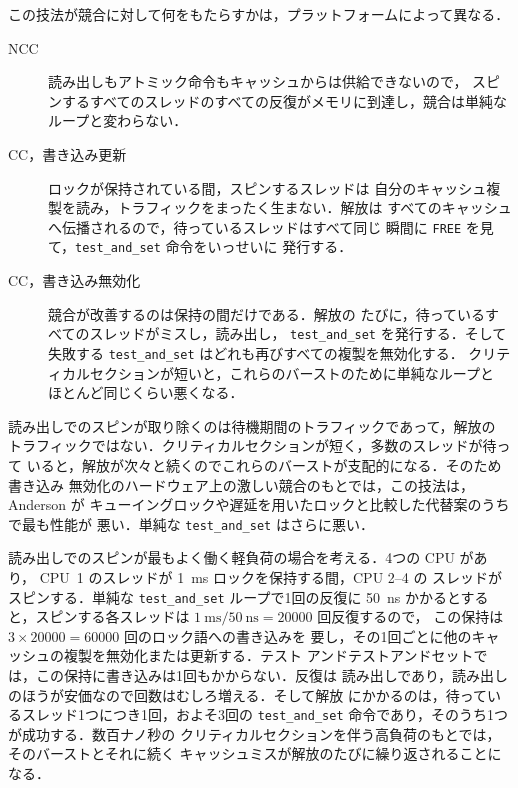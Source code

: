 \documentclass[../main.tex]{subfiles}
\begin{document}
この技法が競合に対して何をもたらすかは，プラットフォームによって異なる．
\begin{description}
  \item[NCC] 読み出しもアトミック命令もキャッシュからは供給できないので，
    スピンするすべてのスレッドのすべての反復がメモリに到達し，競合は単純な
    ループと変わらない．
  \item[CC，書き込み更新] ロックが保持されている間，スピンするスレッドは
    自分のキャッシュ複製を読み，トラフィックをまったく生まない．解放は
    すべてのキャッシュへ伝播されるので，待っているスレッドはすべて同じ
    瞬間に \texttt{FREE} を見て，\texttt{test\_and\_set} 命令をいっせいに
    発行する．
  \item[CC，書き込み無効化] 競合が改善するのは保持の間だけである．解放の
    たびに，待っているすべてのスレッドがミスし，読み出し，
    \texttt{test\_and\_set} を発行する．そして失敗する
    \texttt{test\_and\_set} はどれも再びすべての複製を無効化する．
    クリティカルセクションが短いと，これらのバーストのために単純なループと
    ほとんど同じくらい悪くなる．
\end{description}
読み出しでのスピンが取り除くのは待機期間のトラフィックであって，解放の
トラフィックではない．クリティカルセクションが短く，多数のスレッドが待って
いると，解放が次々と続くのでこれらのバーストが支配的になる．そのため書き込み
無効化のハードウェア上の激しい競合のもとでは，この技法は，Anderson が
キューイングロックや遅延を用いたロックと比較した代替案のうちで最も性能が
悪い．単純な \texttt{test\_and\_set} はさらに悪い．

\begin{example}
  読み出しでのスピンが最もよく働く軽負荷の場合を考える．4つの CPU があり，
  CPU~1 のスレッドが \SI{1}{\milli\second} ロックを保持する間，CPU 2--4 の
  スレッドがスピンする．単純な \texttt{test\_and\_set} ループで1回の反復に
  \SI{50}{\nano\second} かかるとすると，スピンする各スレッドは
  $\SI{1}{\milli\second}/\SI{50}{\nano\second} = \num{20000}$ 回反復するので，
  この保持は $3\times\num{20000} = \num{60000}$ 回のロック語への書き込みを
  要し，その1回ごとに他のキャッシュの複製を無効化または更新する．テスト
  アンドテストアンドセットでは，この保持に書き込みは1回もかからない．反復は
  読み出しであり，読み出しのほうが安価なので回数はむしろ増える．そして解放
  にかかるのは，待っているスレッド1つにつき1回，およそ3回の
  \texttt{test\_and\_set} 命令であり，そのうち1つが成功する．数百ナノ秒の
  クリティカルセクションを伴う高負荷のもとでは，そのバーストとそれに続く
  キャッシュミスが解放のたびに繰り返されることになる．
\end{example}
\end{document}
